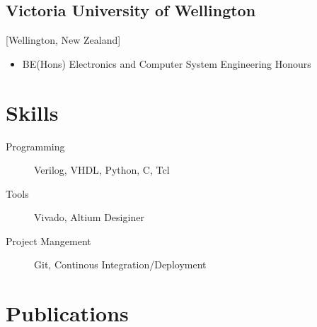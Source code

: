 \documentclass{mycv}
\begin{document}
\subsection{Victoria University of Wellington}[Wellington, New Zealand]
\vspace{-\parskip}%
\begin{itemize}[label={}]
  \item BE(Hons) Electronics and Computer System Engineering Honours 
\end{itemize}

\section{Skills}

\begin{description}
  \item[Programming] Verilog, VHDL, Python, C, Tcl
  \item[Tools] Vivado, Altium Desiginer
  \item[Project Mangement] Git, Continous Integration/Deployment
\end{description}

\section{Publications}%

\end{document}
